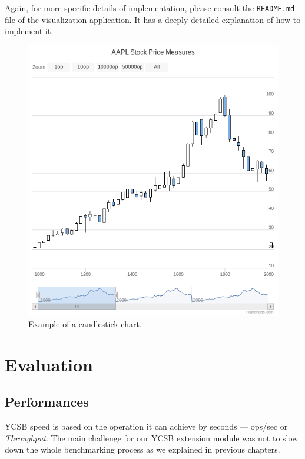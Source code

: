 \documentclass[a4paper,11pt]{report}
\begin{document}
Again, for more specific details of implementation, please consult the \texttt{README.md} file of the visualization application. It has a deeply detailed explanation of how to implement it.

\begin{figure}[ht]
\begin{center}
\includegraphics[scale=0.45]{images/candlestick.png}
\caption{Example of a candlestick chart.}
\label{candlestick}
\end{center}
\end{figure}

\chapter{Evaluation}

\section{Performances}

YCSB speed is based on the operation it can achieve by seconds --- ops/sec or \textit{Throughput}. The main challenge for our YCSB extension module was not to slow down the whole benchmarking process as we explained in previous chapters.
\end{document}
